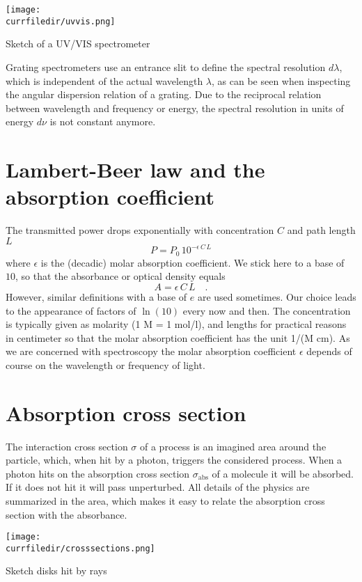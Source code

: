 \begin{marginfigure}
\texttt{[image: \\currfiledir/uvvis.png]}
\caption{Sketch of a UV/VIS spectrometer}
\end{marginfigure}



Grating spectrometers use an entrance slit to define the spectral resolution $d \lambda$, which is independent of the actual wavelength $\lambda$, as can be seen when inspecting the   angular dispersion relation of a grating. Due to the reciprocal relation between wavelength and frequency or energy, the spectral resolution in units of energy $d \nu$ is not constant anymore.




\section{Lambert-Beer law and the absorption coefficient}

The transmitted power drops exponentially with  concentration $C$ and  path length $L$
\begin{equation}
 P = P_0 \, 10^{- \epsilon\, C \, L}
\end{equation}
where $\epsilon$ is the (decadic) molar absorption coefficient. We stick here to a base of $10$, 
so that the absorbance or optical density equals 
\begin{equation}
 A = \epsilon\, C \, L \quad.
\end{equation}
However, similar definitions with a base of $e$ are used sometimes. Our choice leads to the appearance of factors of $\ln(10)$ every now and then. The concentration is typically given as molarity (1 M = 1 mol/l), and lengths for practical reasons in centimeter
so that the molar absorption coefficient has the unit 1/(M  cm). As we are concerned with spectroscopy the molar absorption coefficient $\epsilon$ depends of course on the wavelength or frequency of light.

\section{Absorption cross section}


The interaction cross section $\sigma$ of a process is an imagined area around the particle, which, when hit by a photon, triggers the considered process. When a photon hits on the absorption cross section $\sigma_{\text{abs}}$ of a molecule it will be absorbed. If it does not hit it will pass unperturbed. All details of the physics are summarized in the area, which makes it easy to relate the absorption cross section with the absorbance. 
\begin{marginfigure}
\texttt{[image: \\currfiledir/crosssections.png]}
\caption{Sketch  disks hit by rays}
\end{marginfigure}


